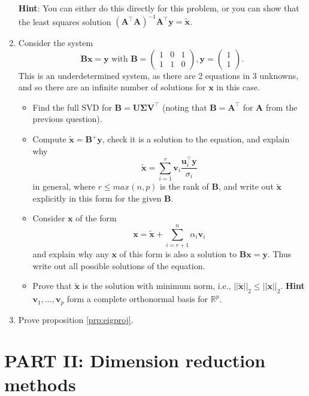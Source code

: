 \documentclass[]{book}
\providecommand{\tightlist}{%
  \setlength{\itemsep}{0pt}\setlength{\parskip}{0pt}}
\theoremstyle{definition}
\theoremstyle{definition}
\theoremstyle{definition}
\theoremstyle{remark}
\begin{document}
\begin{enumerate}
  \textbf{Hint}: You can either do this directly for this problem, or you can show that the least squares solution \((\boldsymbol A^\top \boldsymbol A)^{-1}\boldsymbol A^\top \boldsymbol y=\tilde{\boldsymbol x}\).
\item
  Consider the system
  \[\boldsymbol B\boldsymbol x= \boldsymbol y\mbox{ with }\boldsymbol B=\left(\begin{array}{ccc}1&0&1\\1&1&0\end{array}
  \right),\boldsymbol y= \left(\begin{array}{c}1\\1\end{array}
  \right).\]
  This is an underdetermined system, as there are 2 equations in 3 unknowns, and so there are an infinite number of solutions for \(\boldsymbol x\) in this case.

  \begin{itemize}
  \tightlist
  \item
    Find the full SVD for \(\boldsymbol B=\boldsymbol U\boldsymbol \Sigma\boldsymbol V^\top\) (noting that \(\boldsymbol B=\boldsymbol A^\top\) for \(\boldsymbol A\) from the previous question).
  \item
    Compute
    \(\tilde{\boldsymbol x}=\boldsymbol B^+\boldsymbol y\), check it is a solution to the equation, and explain why \[\tilde{\boldsymbol x}= \sum_{i=1}^r \boldsymbol v_i \frac{\boldsymbol u_i^\top \boldsymbol y}{\sigma_i}\] in general, where \(r\leq max(n,p)\) is the rank of \(\boldsymbol B\), and write out \(\tilde{\boldsymbol x}\) explicitly in this form for the given \(\boldsymbol B\).
  \item
    Consider \(\boldsymbol x\) of the form
    \[\boldsymbol x= \tilde{\boldsymbol x} + \sum_{i=r+1}^n \alpha_i \boldsymbol v_i\]
    and explain why any \(\boldsymbol x\) of this form is also a solution to \(\boldsymbol B\boldsymbol x=\boldsymbol y\). Thus write out all possible solutions of the equation.
  \item
    Prove that \(\tilde{\boldsymbol x}\) is the solution with minimum norm, i.e., \(||\tilde{\boldsymbol x}||_2 \leq ||\boldsymbol x||_2\). \textbf{Hint} \(\boldsymbol v_1, \ldots, \boldsymbol v_p\) form a complete orthonormal basis for \(\mathbb{R}^p\).
  \end{itemize}
\item
  Prove proposition \ref{prp:eigproj}.
\end{enumerate}

\hypertarget{part-ii-dimension-reduction-methods}{%
\chapter*{PART II: Dimension reduction methods}\label{part-ii-dimension-reduction-methods}}
\end{document}
